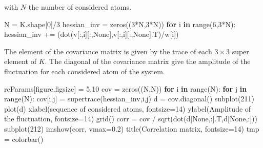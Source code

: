 \documentclass[
]{article}
\newenvironment{Shaded}{}{}
\newcommand{\BuiltInTok}[1]{\textcolor[rgb]{0.00,0.50,0.00}{#1}}
\newcommand{\ControlFlowTok}[1]{\textcolor[rgb]{0.00,0.44,0.13}{\textbf{#1}}}
\newcommand{\DecValTok}[1]{\textcolor[rgb]{0.25,0.63,0.44}{#1}}
\newcommand{\FloatTok}[1]{\textcolor[rgb]{0.25,0.63,0.44}{#1}}
\newcommand{\KeywordTok}[1]{\textcolor[rgb]{0.00,0.44,0.13}{\textbf{#1}}}
\newcommand{\NormalTok}[1]{#1}
\newcommand{\OperatorTok}[1]{\textcolor[rgb]{0.40,0.40,0.40}{#1}}
\newcommand{\StringTok}[1]{\textcolor[rgb]{0.25,0.44,0.63}{#1}}
\newcommand{\VariableTok}[1]{\textcolor[rgb]{0.10,0.09,0.49}{#1}}
\begin{document}
with \(N\) the number of considered atoms.

\begin{Shaded}
\begin{Highlighting}[]
\NormalTok{N }\OperatorTok{=}\NormalTok{ K.shape[}\DecValTok{0}\NormalTok{]}\OperatorTok{/}\DecValTok{3}
\NormalTok{hessian\_inv }\OperatorTok{=}\NormalTok{ zeros((}\DecValTok{3}\OperatorTok{*}\NormalTok{N,}\DecValTok{3}\OperatorTok{*}\NormalTok{N))}
\ControlFlowTok{for}\NormalTok{ i }\KeywordTok{in} \BuiltInTok{range}\NormalTok{(}\DecValTok{6}\NormalTok{,}\DecValTok{3}\OperatorTok{*}\NormalTok{N):}
\NormalTok{    hessian\_inv }\OperatorTok{+=}\NormalTok{ (dot(v[:,i][:,}\VariableTok{None}\NormalTok{],v[:,i][:,}\VariableTok{None}\NormalTok{].T)}\OperatorTok{/}\NormalTok{w[i])}
\end{Highlighting}
\end{Shaded}

The element of the covariance matrix is given by the trace of each
\(3 \times 3\) super element of \(K\). The diagonal of the covariance
matrix give the amplitude of the fluctuation for each considered atom of
the system.

\begin{Shaded}
\begin{Highlighting}[]
\NormalTok{rcParams[}\StringTok{\textquotesingle{}figure.figsize\textquotesingle{}}\NormalTok{] }\OperatorTok{=} \DecValTok{5}\NormalTok{,}\DecValTok{10}
\NormalTok{cov }\OperatorTok{=}\NormalTok{ zeros((N,N))}
\ControlFlowTok{for}\NormalTok{ i }\KeywordTok{in} \BuiltInTok{range}\NormalTok{(N):}
    \ControlFlowTok{for}\NormalTok{ j }\KeywordTok{in} \BuiltInTok{range}\NormalTok{(N):}
\NormalTok{        cov[i,j] }\OperatorTok{=}\NormalTok{ supertrace(hessian\_inv,i,j)}
\NormalTok{d }\OperatorTok{=}\NormalTok{ cov.diagonal()}
\NormalTok{subplot(}\DecValTok{211}\NormalTok{)}
\NormalTok{plot(d)}
\NormalTok{xlabel(}\StringTok{\textquotesingle{}sequence of considered atoms\textquotesingle{}}\NormalTok{, fontsize}\OperatorTok{=}\DecValTok{14}\NormalTok{)}
\NormalTok{ylabel(}\StringTok{\textquotesingle{}Amplitude of the fluctuation\textquotesingle{}}\NormalTok{, fontsize}\OperatorTok{=}\DecValTok{14}\NormalTok{)}
\NormalTok{grid()}
\NormalTok{corr }\OperatorTok{=}\NormalTok{ cov }\OperatorTok{/}\NormalTok{ sqrt(dot(d[}\VariableTok{None}\NormalTok{,:].T,d[}\VariableTok{None}\NormalTok{,:]))}
\NormalTok{subplot(}\DecValTok{212}\NormalTok{)}
\NormalTok{imshow(corr, vmax}\OperatorTok{=}\FloatTok{0.2}\NormalTok{)}
\NormalTok{title(}\StringTok{\textquotesingle{}Correlation matrix\textquotesingle{}}\NormalTok{, fontsize}\OperatorTok{=}\DecValTok{14}\NormalTok{)}
\NormalTok{tmp }\OperatorTok{=}\NormalTok{ colorbar()}
\end{Highlighting}
\end{Shaded}
\end{document}
